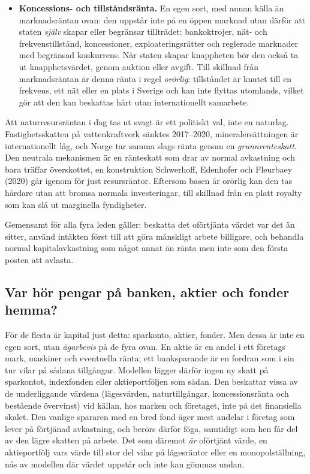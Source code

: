 \documentclass[11pt]{article}
\begin{document}
\begin{itemize}
\item \textbf{Koncessions- och tillståndsränta.} En egen sort, med annan källa än marknadsräntan ovan: den uppstår inte på en öppen marknad utan därför att staten \emph{själv} skapar eller begränsar tillträdet: bankoktrojer, nät- och frekvenstillstånd, koncessioner, exploateringsrätter och reglerade marknader med begränsad konkurrens. När staten skapar knappheten bör den också ta ut knapphetsvärdet, genom auktion eller avgift. Till skillnad från marknadsräntan är denna ränta i regel \emph{orörlig}: tillståndet är knutet till en frekvens, ett nät eller en plats i Sverige och kan inte flyttas utomlands, vilket gör att den kan beskattas hårt utan internationellt samarbete.
\end{itemize}

Att naturresursräntan i dag tas ut svagt är ett politiskt val, inte en naturlag. Fastighetsskatten på vattenkraftverk sänktes 2017--2020, mineralersättningen är internationellt låg, och Norge tar samma slags ränta genom en \emph{grunnrenteskatt}. Den neutrala mekanismen är en ränteskatt som drar av normal avkastning och bara träffar överskottet, en konstruktion Schwerhoff, Edenhofer och Fleurbaey (2020) går igenom för just resursräntor. Eftersom basen är orörlig kan den tas hårdare utan att bromsa normala investeringar, till skillnad från en platt royalty som kan slå ut marginella fyndigheter.

Gemensamt för alla fyra leden gäller: beskatta det oförtjänta värdet var det än sitter, använd intäkten först till att göra mänskligt arbete billigare, och behandla normal kapitalavkastning som något annat än ränta men inte som den första posten att avlasta.

\subsection*{Var hör pengar på banken, aktier och fonder hemma?}

För de flesta är kapital just detta: sparkonto, aktier, fonder. Men dessa är inte en egen sort, utan \emph{ägarbevis} på de fyra ovan. En aktie är en andel i ett företags mark, maskiner och eventuella ränta; ett banksparande är en fordran som i sin tur vilar på sådana tillgångar. Modellen lägger därför ingen ny skatt på sparkontot, indexfonden eller aktieportföljen som sådan. Den beskattar vissa av de underliggande värdena (lägesvärden, naturtillgångar, koncessionsränta och bestående övervinst) vid källan, hos marken och företaget, inte på det finansiella skalet. Den vanlige spararen med en bred fond äger mest andelar i företag som lever på förtjänad avkastning, och berörs därför föga, samtidigt som hen får del av den lägre skatten på arbete. Det som däremot \emph{är} oförtjänt värde, en aktieportfölj vars värde till stor del vilar på lägesräntor eller en monopolställning, nås av modellen där värdet uppstår och inte kan gömmas undan.
\end{document}
